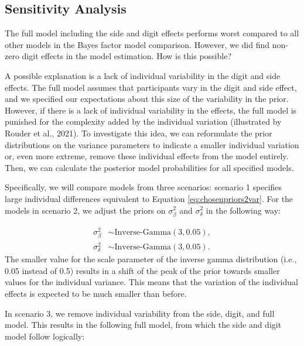 \documentclass[
  english,
  doc,floatsintext]{apa6}
\begin{document}
\hypertarget{sensitivity-analysis}{%
\subsection{Sensitivity Analysis}\label{sensitivity-analysis}}

The full model including the side and digit effects performs worst compared to all other models in the Bayes factor model comparison. However, we did find non-zero digit effects in the model estimation. How is this possible?

A possible explanation is a lack of individual variability in the digit and side effects. The full model assumes that participants vary in the digit and side effect, and we specified our expectations about this size of the variability in the prior. However, if there is a lack of individual variability in the effects, the full model is punished for the complexity added by the individual variation (illustrated by Rouder et al., 2021). To investigate this idea, we can reformulate the prior distributions on the variance parameters to indicate a smaller individual variation or, even more extreme, remove these individual effects from the model entirely. Then, we can calculate the posterior model probabilities for all specified models.

Specifically, we will compare models from three scenarios: scenario 1 specifies large individual differences equivalent to Equation \eqref{eq:chosenpriors2var}. For the models in scenario 2, we adjust the priors on \(\sigma^2_{\beta}\) and \(\sigma^2_{\delta}\) in the following way:

\begin{equation}
\begin{aligned}
\sigma^2_{\beta} &\sim \text{Inverse-Gamma}(3, 0.05), \\   
\sigma^2_{\delta} &\sim \text{Inverse-Gamma}(3, 0.05). 
\end{aligned}
\end{equation}
The smaller value for the scale parameter of the inverse gamma distribution (i.e., 0.05 instead of 0.5) results in a shift of the peak of the prior towards smaller values for the individual variance. This means that the variation of the individual effects is expected to be much smaller than before.

In scenario 3, we remove individual variability from the side, digit, and full model. This results in the following full model, from which the side and digit model follow logically:
\end{document}
